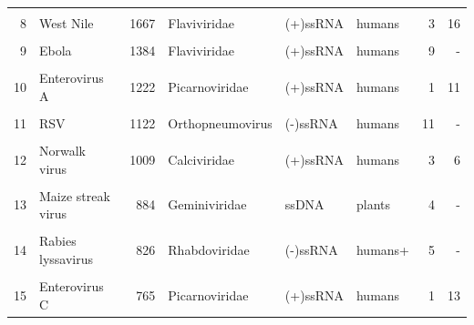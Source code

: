 \documentclass[landscape]{slides}
\begin{document}
\begin{slide}
\begin{center}
\begin{tabular}{r|l|r|l|l|l|r|r}
     &                     &              &                &          &        &       &          \\ 
  8  & West Nile           &        1667  & Flaviviridae   & (+)ssRNA & humans &     3 & 16       \\ %
     &                     &              &                &          &        &       &          \\ 
  9  & Ebola               &        1384  & Flaviviridae   & (+)ssRNA & humans &     9 & -        \\ %
     &                     &              &                &          &        &       &          \\ 
 10  & Enterovirus A       &        1222  & Picarnoviridae & (+)ssRNA & humans &     1 & 11       \\ %
     &                     &              &                &          &        &       &          \\ 
 11  & RSV                 &        1122  & Orthopneumovirus& (-)ssRNA& humans &    11 & -        \\ %
     &                     &              &                &          &        &       &          \\ 
 12  & Norwalk virus       &        1009  & Calciviridae   & (+)ssRNA & humans &     3 & 6        \\ %
     &                     &              &                &          &        &       &          \\ 
 13  & Maize streak virus  &         884  & Geminiviridae  & ssDNA    & plants &     4 & -        \\ %
     &                     &              &                &          &        &       &          \\ 
 14  & Rabies lyssavirus   &         826  & Rhabdoviridae  & (-)ssRNA & humans+&     5 & -        \\ %
     &                     &              &                &          &        &       &          \\ 
 15  & Enterovirus C       &         765  & Picarnoviridae & (+)ssRNA & humans &     1 & 13       \\ %
\end{tabular}

\tiny
{}
\vfill

\end{center}
\end{slide}
\end{document}
